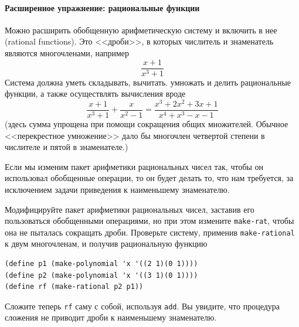 \paragraph{Расширенное упражнение: рациональные функции}

Можно расширить обобщенную арифметическую систему и
включить в нее  
 (rational functions).  Это <<дроби>>, в которых числитель и знаменатель
являются многочленами, например
$$
\frac{x+1}{x^3+1}
$$
Система должна уметь складывать, вычитать. умножать и делить
рациональные функции, а также осуществлять вычисления вроде
$$
\frac{x+1}{x^3+1} + \frac{x}{x^2-1} 
  = \frac{x^3 + 2x^2 + 3x + 1}{x^4 + x^3 - x - 1}
$$
(здесь сумма упрощена при помощи сокращения общих множителей.  Обычное
<<перекрестное умножение>> дало бы многочлен четвертой степени в
числителе и пятой в знаменателе.)

Если мы изменим пакет арифметики рациональных чисел так,
чтобы он использовал обобщенные операции, то он будет делать то, что
нам требуется, за исключением задачи приведения к наименьшему знаменателю.
\begin{exercise}{2.93}\label{EX2.93}%
Модифицируйте пакет арифметики рациональных чисел,
заставив его пользоваться обобщенными операциями, но при этом измените
{\tt make-rat}, чтобы она не пыталась сокращать дроби.
Проверьте систему, применив {\tt make-rational} к двум
многочленам, и получив рациональную функцию

\begin{Verbatim}[fontsize=\small]
(define p1 (make-polynomial 'x '((2 1)(0 1))))
(define p2 (make-polynomial 'x '((3 1)(0 1))))
(define rf (make-rational p2 p1))
\end{Verbatim}
Сложите теперь {\tt rf} саму с собой, используя
{\tt add}.  Вы увидите, что процедура сложения не приводит
дроби к наименьшему знаменателю.
\end{exercise}

\medskip

